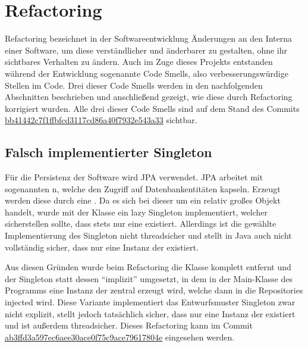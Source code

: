 \chapter{Refactoring}
Refactoring bezeichnet in der Softwareentwicklung Änderungen an den Interna einer Software, um diese verständlicher und änderbarer zu gestalten, ohne ihr sichtbares Verhalten zu ändern. Auch im Zuge dieses Projekts entstanden während der Entwicklung sogenannte Code Smells, also verbesserungswürdige Stellen im Code. Drei dieser Code Smells werden in den nachfolgenden Abschnitten beschrieben und anschließend gezeigt, wie diese durch Refactoring korrigiert wurden. Alle drei dieser Code Smells sind auf dem Stand des Commits \href{https://github.com/anditru/quickie/tree/bb41442c7f1ffbfcd3117cd86a40f7932e543a33}{bb41442c7f1ffbfcd3117cd86a40f7932e543a33} sichtbar.

\section{Falsch implementierter Singleton}
Für die Persistenz der Software wird \ac{JPA} verwendet. \ac{JPA} arbeitet mit sogenannten n, welche den Zugriff auf Datenbankentitäten kapseln. Erzeugt werden diese  durch eine . Da es sich bei dieser um ein relativ großes Objekt handelt, wurde mit der Klasse  ein lazy Singleton implementiert, welcher sicherstellen sollte, dass stets nur eine  existiert. Allerdings ist die gewählte Implementierung des Singleton nicht threadsicher und stellt in Java auch nicht vollständig sicher, dass nur eine Instanz der  existiert.

Aus diesen Gründen wurde beim Refactoring die Klasse  komplett entfernt und der Singleton statt dessen \enquote{implizit} umgesetzt, in dem in der Main-Klasse des Programms eine Instanz der  zentral erzeugt wird, welche dann in die Repositories injected wird. Diese Variante implementiert das Entwurfsmuster Singleton zwar nicht explizit, stellt jedoch tatsächlich sicher, dass nur eine Instanz der  existiert und ist außerdem threadsicher. Dieses Refactoring kann im Commit \href{https://github.com/anditru/quickie/commit/ab3ffd3a597ec6aee30ace0f75c9ace79617804e}{ab3ffd3a597ec6aee30ace0f75c9ace79617804e} eingesehen werden.

